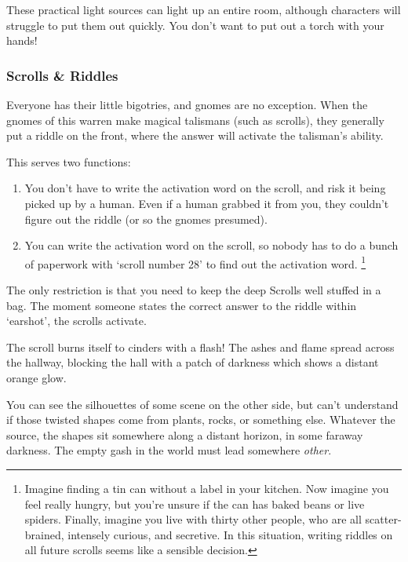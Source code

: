 \begin{multicols}{2}
These practical light sources can light up an entire room, although characters will struggle to put them out quickly.
You don't want to put out a torch with your hands!

\subsubsection{Scrolls \& Riddles}
\label{scrollRiddles}

Everyone has their little bigotries, and gnomes are no exception.
When the gnomes of this \gls{warren} make magical \glspl{talisman} (such as scrolls), they generally put a riddle on the front, where the answer will activate the \gls{talisman}'s ability.

This serves two functions:

\begin{enumerate}
  \item
  You don't have to write the activation word on the scroll, and risk it being picked up by a human.
  Even if a human grabbed it from you, they couldn't figure out the riddle (or so the gnomes presumed).
  \item
  You can write the activation word on the scroll, so nobody has to do a bunch of paperwork with `scroll number 28' to find out the activation word.%
  \footnote{Imagine finding a tin can without a label in your kitchen.
  Now imagine you feel really hungry, but you're unsure if the can has baked beans or live spiders.
  Finally, imagine you live with thirty other people, who are all scatter-brained, intensely curious, and secretive.
  In this situation, writing riddles on all future scrolls seems like a sensible decision.}
\end{enumerate}

The only restriction is that you need to keep the \Gls{deep} Scrolls well stuffed in a bag.
The moment someone states the correct answer to the riddle within `earshot', the scrolls activate.

\labyrinthScroll

\showTalisman

\begin{boxtext}
  The scroll burns itself to cinders with a flash!
  The ashes and flame spread across the hallway, blocking the hall with a patch of darkness which shows a distant orange glow.

  You can see the silhouettes of some scene on the other side, but can't understand if those twisted shapes come from plants, rocks, or something else.
  Whatever the source, the shapes sit somewhere along a distant horizon, in some faraway darkness.
  The empty gash in the world must lead somewhere \emph{other}.
\end{boxtext}


\end{multicols}
